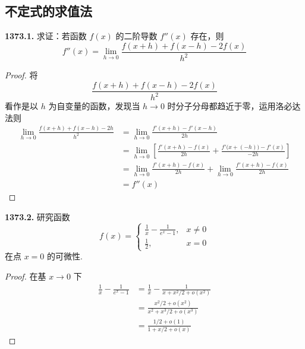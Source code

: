 \subsection{不定式的求值法}
\textbf{1373.1.} 求证：若函数 $f(x)$ 的二阶导数 $f''(x)$ 存在，则
\[f''(x) = \lim_{h \rightarrow 0} \frac{f(x + h) + f(x - h) - 2f(x)}{h^2}\]

\begin{proof}
    将
    \[\frac{f(x + h) + f(x - h) - 2f(x)}{h^2}\]
    看作是以 $h$ 为自变量的函数，发现当 $h \rightarrow 0$ 时分子分母都趋近于零，运用洛必达法则
    \begin{align*}
        \lim_{h \rightarrow 0} \frac{f(x + h) + f(x - h) - 2h}{h^2} &= \lim_{h \rightarrow 0} \frac{f'(x+h) - f'(x-h)}{2h}\\
        &= \lim_{h \rightarrow 0} \left[\frac{f'(x+h) - f(x)}{2h} + \frac{f'\bigl(x+(-h)\bigr) - f'(x)}{-2h}\right]\\
        &= \lim_{h \rightarrow 0} \frac{f'(x+h) - f(x)}{2h} + \lim_{h \rightarrow 0} \frac{f'(x+h) - f(x)}{2h}\\
        &= f''(x)
    \end{align*}
\end{proof}\vspace{9pt}

\textbf{1373.2.} 研究函数
\[f(x) = \begin{cases}
    \frac{1}{x} - \frac{1}{e^x - 1}, & x \neq 0\\
    \frac{1}{2}, & x = 0
\end{cases}\]
在点 $x = 0$ 的可微性.

\begin{proof}
    在基 $x \rightarrow 0$ 下
    \begin{align*}
        \frac{1}{x} - \frac{1}{e^x - 1} &= \frac{1}{x} - \frac{1}{x + x^2/2 + o(x^2)}\\
        &= \frac{x^2/2 + o(x^2)}{x^2 + x^3/2 + o(x^3)}\\
        &= \frac{1/2 + o(1)}{1 + x/2 + o(x)}
    \end{align*}
\end{proof}
